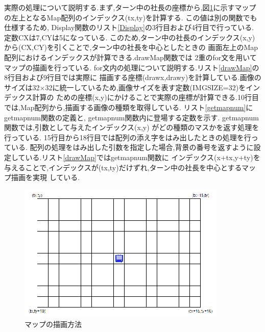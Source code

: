\documentclass[a4j]{jarticle}
\begin{document}
        実際の処理について説明する.まず,ターン中の社長の座標から,図\ref{mapdesc}に示すマップの左上となるMap配列のインデックス(tx,ty)を計算する.
        この値は別の関数でも仕様するため, Display関数のリスト\ref{Display}の3行目および4行目で行っている. 定数CXは7,CYは5になっている.
        このため,ターン中の社長のインデックス(x,y)から(CX,CY)を引くことで,ターン中の社長を中心としたときの
        画面左上のMap配列におけるインデックスが計算できる.drawMap関数では
        2重のfor文を用いてマップの描画を行っている. for文内の処理について説明する.リスト\ref{drawMap}の8行目および9行目では実際に
        描画する座標(drawx,drawy)を計算している.画像のサイズは32$\times$32に統一しているため,画像サイズを表す定数(IMGSIZE=32)をインデックス計算の
        ための座標(x,y)にかけることで実際の座標が計算できる.10行目では,Map配列から,描画する画像の種類を取得している. リスト\ref{getmapnum}に
        getmapnum関数の定義と, getmapnum関数内に登場する定数を示す. getmapnum関数では,引数として与えたインデックス(x,y)
        がどの種類のマスかを返す処理を行っている. 15行目から18行目では配列の添え字をはみ出したときの処理を行っている.
        配列の処理をはみ出した引数を指定した場合,背景の番号を返すように設定している.リスト\ref{drawMap}ではgetmapnum関数に
        インデックス(x+tx,y+ty)を与えることで,インデックスが(tx,ty)だけずれ,ターン中の社長を中心とするマップ描画を実現
        している.

        \begin{figure}[H]
            \centering
            \includegraphics[scale=2.7]{mapdesc.eps}
            \caption{マップの描画方法}
             \label{mapdesc}
            \end{figure} 
\end{document}
